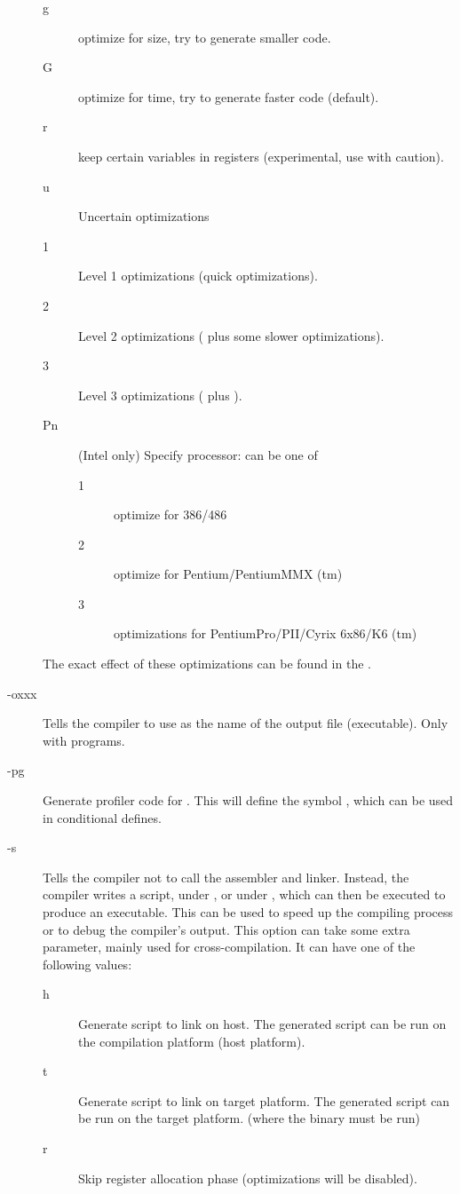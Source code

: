 \begin{description}
\begin{description}
\item[g] optimize for size, try to generate smaller code.
\item[G] optimize for time, try to generate faster code (default).
\item[r] keep certain variables in registers (experimental, use with
caution).
\item[u] Uncertain optimizations
\item[1] Level 1 optimizations (quick optimizations).
\item[2] Level 2 optimizations ( plus some slower optimizations).
\item[3] Level 3 optimizations ( plus ).
\item[Pn] (Intel only) Specify processor:  can be one of
\begin{description}
\item[1] optimize for 386/486
\item[2] optimize for Pentium/PentiumMMX (tm)
\item[3] optimizations for PentiumPro/PII/Cyrix 6x86/K6 (tm)
\end{description}
\end{description}
The exact effect of these optimizations can be found in the \progref.
\item [-oxxx] Tells the compiler to use  as the name of the output
file (executable). Only with programs.
\item [-pg]  Generate profiler code for . This will
define the symbol , which can be used in conditional
defines.
\item [-s]  Tells the compiler not to call the assembler and linker.
Instead, the compiler writes a script,  under \dos, or
 under \linux, which can then be executed to produce an
executable. This can be used to speed up the compiling process or to debug
the compiler's output. This option can take some extra parameter, mainly
used for cross-compilation. It can have one of the following values:
\begin{description}
\item[h] Generate script to link on host. The generated script can be run on
the compilation platform (host platform).
\item[t] Generate script to link on target platform. The generated script
can be run on the target platform. (where the binary must be run)
\item[r] Skip register allocation phase (optimizations will be disabled).

\end{description}
\end{description}
